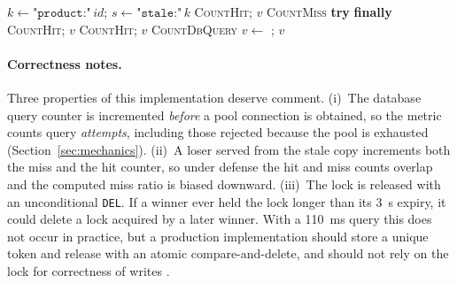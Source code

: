 \begin{algorithm}[t]
\caption{Product read path with single-flight locking and stale-while-revalidate}
\label{alg:read}
\begin{algorithmic}[1]
  \State $k \gets \texttt{"product:"}\,id$; \quad $s \gets \texttt{"stale:"}\,k$
   \State \textsc{CountHit}; \Return $v$ \EndIf
  \State \textsc{CountMiss}
   \State \Return {} \EndIf
   
     \State \textbf{try} \Return {} \textbf{finally} 
  \EndIf
   \State \textsc{CountHit}; \Return $v$ \EndIf
   
     \State {}
      \State \textsc{CountHit}; \Return $v$ \EndIf
  \EndFor
  \State \Return {}
\EndFunction
\Statex
{}
  \State \textsc{CountDbQuery}
  \State $v \gets$  
  \State {}; 
  \State \Return $v$
\EndFunction
\end{algorithmic}
\end{algorithm}

\paragraph{Correctness notes.} Three properties of this implementation deserve comment.
(i)~The database query counter is incremented \emph{before} a pool connection is
obtained, so the metric counts query \emph{attempts}, including those rejected because
the pool is exhausted (Section~\ref{sec:mechanics}). (ii)~A loser served from the stale
copy increments both the miss and the hit counter, so under defense the hit and miss
counts overlap and the computed miss ratio is biased downward. (iii)~The lock is
released with an unconditional \texttt{DEL}. If a winner ever held the lock longer than
its 3~s expiry, it could delete a lock acquired by a later winner. With a 110~ms query
this does not occur in practice, but a production implementation should store a unique
token and release with an atomic compare-and-delete, and should not rely on the lock
for correctness of writes \cite{kleppmann2016}.

